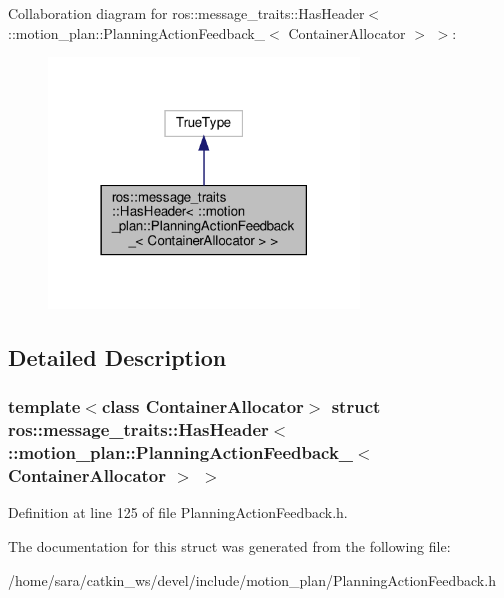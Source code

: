 Collaboration diagram for ros\+:\+:message\+\_\+traits\+:\+:Has\+Header$<$ \+:\+:motion\+\_\+plan\+:\+:Planning\+Action\+Feedback\+\_\+$<$ Container\+Allocator $>$ $>$\+:
\nopagebreak
\begin{figure}[H]
\begin{center}
\leavevmode
\includegraphics[width=234pt]{structros_1_1message__traits_1_1HasHeader_3_01_1_1motion__plan_1_1PlanningActionFeedback___3_01C9314ba1645c1aab6d68144b3b656c536}
\end{center}
\end{figure}


\subsection{Detailed Description}
\subsubsection*{template$<$class Container\+Allocator$>$\newline
struct ros\+::message\+\_\+traits\+::\+Has\+Header$<$ \+::motion\+\_\+plan\+::\+Planning\+Action\+Feedback\+\_\+$<$ Container\+Allocator $>$ $>$}



Definition at line 125 of file Planning\+Action\+Feedback.\+h.



The documentation for this struct was generated from the following file\+:\begin{DoxyCompactItemize}
\item 
/home/sara/catkin\+\_\+ws/devel/include/motion\+\_\+plan/Planning\+Action\+Feedback.\+h\end{DoxyCompactItemize}
